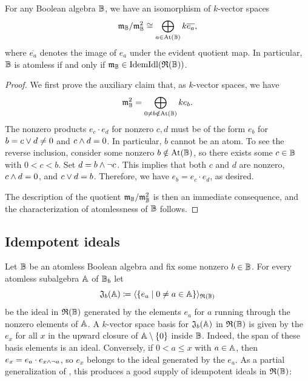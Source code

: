 \documentclass{amsart}
\begin{document}
    \begin{Lem}\label{lem:tangent}
        For any Boolean algebra $\mathbb{B}$, we have an isomorphism of $k$-vector spaces
            \[
                \mathfrak{m}_{\mathbb{B}}/\mathfrak{m}_{\mathbb{B}}^2 \cong \bigoplus_{a \in \operatorname{At}(\mathbb{B})}k\overline{e_a},
            \]
        where $\overline{e_a}$ denotes the image of $e_a$ under the evident quotient map. In particular, $\mathbb{B}$ is atomless if and only if $\mathfrak{m}_{\mathbb{B}} \in \mathrm{IdemIdl}(\mathfrak{R}(\mathbb{B}))$.
    \end{Lem}
    \begin{proof}
        We first prove the auxiliary claim that, as $k$-vector spaces, we have
            \[
                \mathfrak{m}_{\mathbb{B}}^2 = \bigoplus_{ 0 \neq b \notin \operatorname{At}(\mathbb{B})}ke_b.
            \]
        The nonzero products $e_c \cdot e_d$ for nonzero $c,d$ must be of the form $e_b$ for $b = c \lor d \neq 0$ and $c \land d = 0$. In particular, $b$ cannot be an atom. To see the reverse inclusion, consider some nonzero $b \notin \operatorname{At}(\mathbb{B})$, so there exists some $c \in \mathbb{B}$ with $0 < c < b$. Set $d = b \land \lnot c$. This implies that both $c$ and $d$ are nonzero, $c\land d = 0$, and $c \lor d = b$. Therefore, we have $e_b = e_c\cdot e_d$, as desired.
    
        The description of the quotient $\mathfrak{m}_{\mathbb{B}}/\mathfrak{m}_{\mathbb{B}}^2$ is then an immediate consequence, and the characterization of atomlessness of $\mathbb{B}$ follows.
    \end{proof}
    
    \subsection{Idempotent ideals}\label{ssec:idempotentideals}
    
    Let $\mathbb{B}$ be an atomless Boolean algebra and fix some nonzero $b \in \mathbb{B}$. For every atomless subalgebra $\mathbb{A}$ of $\mathbb{B}_b$ let 
        \begin{equation}\label{eq:idealmachine}
            \mathfrak{J}_{b}(\mathbb{A}) \coloneqq \langle \{ e_a \mid 0 \neq a \in \mathbb{A}\}\rangle_{\mathfrak{R}(\mathbb{B})}
        \end{equation}
    be the ideal in $\mathfrak{R}(\mathbb{B})$ generated by the elements $e_a$ for $a$ running through the nonzero elements of $\mathbb{A}$. A $k$-vector space basis for $\mathfrak{J}_{b}(\mathbb{A})$ in $\mathfrak{R}(\mathbb{B})$ is given by the $e_x$ for all $x$ in the upward closure of $\mathbb{A}\setminus\{0\}$ inside $\mathbb{B}$. Indeed, the span of these basis elements is an ideal. Conversely, if $0 < a \leq x$ with $ a \in \mathbb{A}$, then $e_x=e_a \cdot e_{x\land\neg a}$, so $e_x$ belongs to the ideal generated by the $e_a$. As a partial generalization of , this produces a good supply of idempotent ideals in $\mathfrak{R}(\mathbb{B})$:
    
\end{document}
